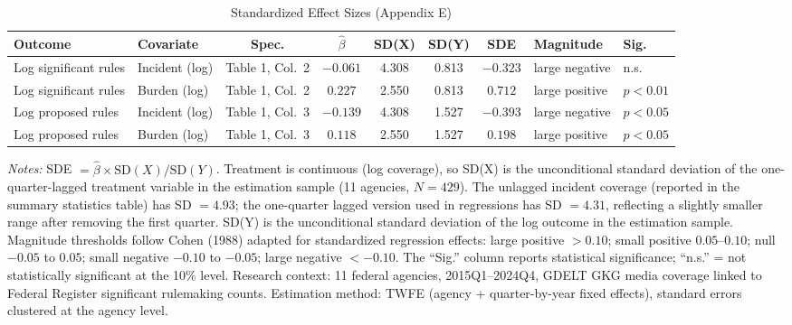 \begin{table}[H]
\centering
\caption{\label{tab:tab:sde}Standardized Effect Sizes (Appendix E)}
\begin{adjustbox}{max width=\textwidth}
\begin{threeparttable}
\begin{tabular}{llcccccll}
\toprule
Outcome & Covariate & Spec. & $\hat{\beta}$ & SD(X) & SD(Y) & SDE & Magnitude & Sig. \\
\midrule
Log significant rules & Incident (log) & Table 1, Col.\ 2 & $-0.061$ & 4.308 & 0.813 & $-0.323$ & large negative & n.s. \\
Log significant rules & Burden (log) & Table 1, Col.\ 2 & $0.227$ & 2.550 & 0.813 & $0.712$ & large positive & $p<0.01$ \\
Log proposed rules & Incident (log) & Table 1, Col.\ 3 & $-0.139$ & 4.308 & 1.527 & $-0.393$ & large negative & $p<0.05$ \\
Log proposed rules & Burden (log) & Table 1, Col.\ 3 & $0.118$ & 2.550 & 1.527 & $0.198$ & large positive & $p<0.05$ \\
\bottomrule
\end{tabular}
\begin{tablenotes}
\small
\item \textit{Notes:} SDE $= \hat{\beta} \times \text{SD}(X) / \text{SD}(Y)$. Treatment is continuous (log coverage), so SD(X) is the unconditional standard deviation of the one-quarter-lagged treatment variable in the estimation sample (11 agencies, $N=429$). The unlagged incident coverage (reported in the summary statistics table) has SD $= 4.93$; the one-quarter lagged version used in regressions has SD $= 4.31$, reflecting a slightly smaller range after removing the first quarter. SD(Y) is the unconditional standard deviation of the log outcome in the estimation sample. Magnitude thresholds follow Cohen (1988) adapted for standardized regression effects: large positive $> 0.10$; small positive $0.05$--$0.10$; null $-0.05$ to $0.05$; small negative $-0.10$ to $-0.05$; large negative $< -0.10$. The ``Sig.'' column reports statistical significance; ``n.s.'' = not statistically significant at the 10\% level. Research context: 11 federal agencies, 2015Q1--2024Q4, GDELT GKG media coverage linked to Federal Register significant rulemaking counts. Estimation method: TWFE (agency + quarter-by-year fixed effects), standard errors clustered at the agency level.
\end{tablenotes}
\end{threeparttable}
\end{adjustbox}
\end{table}
